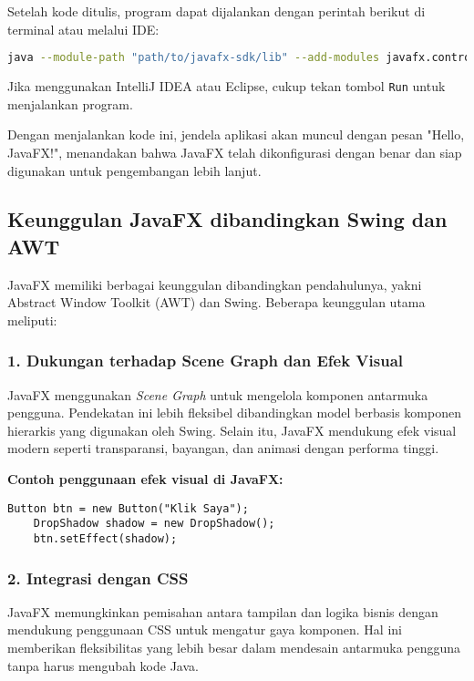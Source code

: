 Setelah kode ditulis, program dapat dijalankan dengan perintah berikut di terminal atau melalui IDE:

\begin{lstlisting}[language=bash, caption=Menjalankan program Hello World]
	java --module-path "path/to/javafx-sdk/lib" --add-modules javafx.controls,javafx.fxml -jar HelloWorld.jar
\end{lstlisting}

Jika menggunakan IntelliJ IDEA atau Eclipse, cukup tekan tombol \texttt{Run} untuk menjalankan program.

Dengan menjalankan kode ini, jendela aplikasi akan muncul dengan pesan "Hello, JavaFX!", menandakan bahwa JavaFX telah dikonfigurasi dengan benar dan siap digunakan untuk pengembangan lebih lanjut.


\subsection{Keunggulan JavaFX dibandingkan Swing dan AWT}

JavaFX memiliki berbagai keunggulan dibandingkan pendahulunya, yakni Abstract Window Toolkit (AWT) dan Swing. Beberapa keunggulan utama meliputi:

\subsubsection{1. Dukungan terhadap Scene Graph dan Efek Visual}
JavaFX menggunakan \textit{Scene Graph} untuk mengelola komponen antarmuka pengguna. Pendekatan ini lebih fleksibel dibandingkan model berbasis komponen hierarkis yang digunakan oleh Swing. Selain itu, JavaFX mendukung efek visual modern seperti transparansi, bayangan, dan animasi dengan performa tinggi.

\textbf{Contoh penggunaan efek visual di JavaFX:}
\begin{lstlisting}[style=JavaStyle, caption=Menambahkan efek bayangan pada sebuah tombol]
	Button btn = new Button("Klik Saya");
	DropShadow shadow = new DropShadow();
	btn.setEffect(shadow);
\end{lstlisting}

\subsubsection{2. Integrasi dengan CSS}
JavaFX memungkinkan pemisahan antara tampilan dan logika bisnis dengan mendukung penggunaan CSS untuk mengatur gaya komponen. Hal ini memberikan fleksibilitas yang lebih besar dalam mendesain antarmuka pengguna tanpa harus mengubah kode Java.

